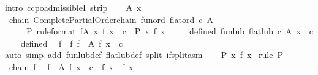 \begin{isabellebody}
%
\isadelimproof
%
\endisadelimproof
%
\isatagproof
{}\isamarkupfalse%
{\isacharparenleft}{\kern0pt}intro\ ccpo{\isachardot}{\kern0pt}admissibleI\ strip{\isacharparenright}{\kern0pt}\isanewline
\ \ \isamarkupfalse%
\ A\ x\isanewline
\ \ \isamarkupfalse%
\ chain{\isacharcolon}{\kern0pt}\ {\isachardoublequoteopen}Complete{\isacharunderscore}{\kern0pt}Partial{\isacharunderscore}{\kern0pt}Order{\isachardot}{\kern0pt}chain\ {\isacharparenleft}{\kern0pt}fun{\isacharunderscore}{\kern0pt}ord\ {\isacharparenleft}{\kern0pt}flat{\isacharunderscore}{\kern0pt}ord\ c{\isacharparenright}{\kern0pt}{\isacharparenright}{\kern0pt}\ A{\isachardoublequoteclose}\isanewline
\ \ \ \ \ P\ {\isacharbrackleft}{\kern0pt}rule{\isacharunderscore}{\kern0pt}format{\isacharbrackright}{\kern0pt}{\isacharcolon}{\kern0pt}\ {\isachardoublequoteopen}{\isasymforall}f{\isasymin}A{\isachardot}{\kern0pt}\ {\isasymforall}x{\isachardot}{\kern0pt}\ f\ x\ {\isasymnoteq}\ c\ {\isasymlongrightarrow}\ P\ x\ {\isacharparenleft}{\kern0pt}f\ x{\isacharparenright}{\kern0pt}{\isachardoublequoteclose}\isanewline
\ \ \ \ \ defined{\isacharcolon}{\kern0pt}\ {\isachardoublequoteopen}fun{\isacharunderscore}{\kern0pt}lub\ {\isacharparenleft}{\kern0pt}flat{\isacharunderscore}{\kern0pt}lub\ c{\isacharparenright}{\kern0pt}\ A\ x\ {\isasymnoteq}\ c{\isachardoublequoteclose}\isanewline
\ \ \isamarkupfalse%
\ defined\ \isamarkupfalse%
\ f\ \ f{\isacharcolon}{\kern0pt}\ {\isachardoublequoteopen}f\ {\isasymin}\ A{\isachardoublequoteclose}\ {\isachardoublequoteopen}f\ x\ {\isasymnoteq}\ c{\isachardoublequoteclose}\isanewline
\ \ \ \ \isamarkupfalse%
{\isacharparenleft}{\kern0pt}auto\ simp\ add{\isacharcolon}{\kern0pt}\ fun{\isacharunderscore}{\kern0pt}lub{\isacharunderscore}{\kern0pt}def\ flat{\isacharunderscore}{\kern0pt}lub{\isacharunderscore}{\kern0pt}def\ split{\isacharcolon}{\kern0pt}\ if{\isacharunderscore}{\kern0pt}split{\isacharunderscore}{\kern0pt}asm{\isacharparenright}{\kern0pt}\isanewline
\ \ \isamarkupfalse%
\ {\isachardoublequoteopen}P\ x\ {\isacharparenleft}{\kern0pt}f\ x{\isacharparenright}{\kern0pt}{\isachardoublequoteclose}\ \isamarkupfalse%
{\isacharparenleft}{\kern0pt}rule\ P{\isacharparenright}{\kern0pt}\isanewline
\ \ \isamarkupfalse%
\ \isamarkupfalse%
\ chain\ f\ \isamarkupfalse%
\ {\isachardoublequoteopen}{\isasymforall}f{\isacharprime}{\kern0pt}\ {\isasymin}\ A{\isachardot}{\kern0pt}\ f{\isacharprime}{\kern0pt}\ x\ {\isacharequal}{\kern0pt}\ c\ {\isasymor}\ f{\isacharprime}{\kern0pt}\ x\ {\isacharequal}{\kern0pt}\ f\ x{\isachardoublequoteclose}\isanewline

\end{isabellebody}
